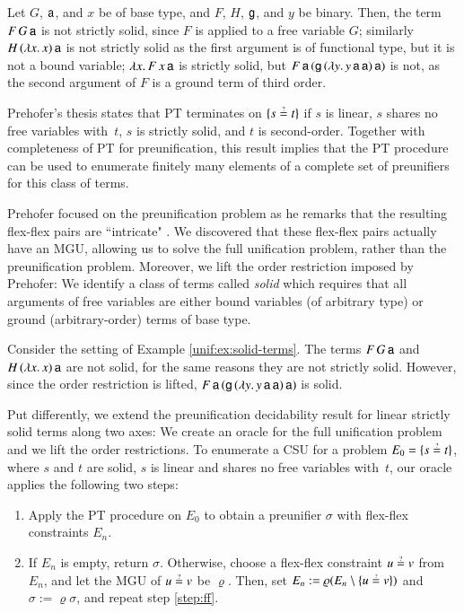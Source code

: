 \begin{exa}
\label{unif:ex:solid-terms}
Let $G$, $\mathsf{a}$, and $x$ be of base type, and $F$, $H$, $\mathsf{g}$, and $y$ be
binary. Then, the term $F \, G \, \mathsf{a}$ is not strictly solid, since $F$ is
applied to a free variable $G$; similarly $H \, (\lambda x. \, x) \, \mathsf{a}$ is
not strictly solid as the first argument is of functional type, but it is not
a bound variable; $\lambda x. \, F \, x \, \mathsf{a}$ is strictly solid, but $F \, \mathsf{a} \, (\mathsf{g} \, (\lambda y. \,
y\,\mathsf{a}\,\mathsf{a})  \, \mathsf{a})$ is not, as the second
argument of $F$ is a ground term of third order. 
\end{exa}

Prehofer's thesis states that PT terminates on $\{s \unif t\}$
if $s$ is linear, $s$ shares no free variables with~$t$, $s$ is strictly solid,
and $t$ is second-order. Together with completeness of PT for preunification,
this result implies that the PT procedure can be used to enumerate finitely many
elements of a complete set of preunifiers for this class of terms.

Prehofer focused on the preunification problem as he remarks that the resulting
flex-flex pairs are ``intricate" \cite[Sect.~5.2.2]{cp-95-unifphd}. We discovered that these flex-flex
pairs actually have an MGU, allowing us to solve the full unification problem,
rather than the preunification problem. Moreover, we lift the order restriction
imposed by Prehofer: We identify a class of terms called \emph{solid} which
requires that all arguments of free variables are either bound variables (of
arbitrary type) or ground (arbitrary-order) terms of base type.

\begin{exa}
  Consider the setting of Example \ref{unif:ex:solid-terms}. The terms $F \, G \,
  \mathsf{a}$ and $H \, (\lambda x. \, x) \, \mathsf{a}$ are not solid, for the same reasons they are not strictly solid.
  However, since the order restriction is lifted, $F \, \mathsf{a} \, (\mathsf{g} \, (\lambda y. \,
  y\,\mathsf{a}\,\mathsf{a})  \, \mathsf{a})$ is solid.
\end{exa}


Put differently, we extend the preunification decidability result
for linear strictly solid terms along two axes: We create an oracle
for the full unification problem and we lift the
order restrictions.
%
To enumerate a CSU for a problem $E_0 = \{s \unif t\}$, where $s$ and $t$ are solid,
$s$ is linear and shares no free variables with~$t$, our oracle applies the following two steps:
\begin{enumerate}
  \item Apply the PT procedure on $E_0$ to obtain a preunifier $\sigma$ with
  flex-flex constraints $E_n$.
  \item\label{step:ff} If $E_n$ is empty, return $\sigma$. Otherwise, choose a flex-flex constraint $u \unif v$ from $E_n$, and let the MGU of $u \unif v$
  be $\varrho$. Then, set $E_n := \varrho(E_n \setminus \{ u \unif v \})$ and
   $\sigma := \varrho\sigma$, and repeat step \ref{step:ff}.
\end{enumerate}

